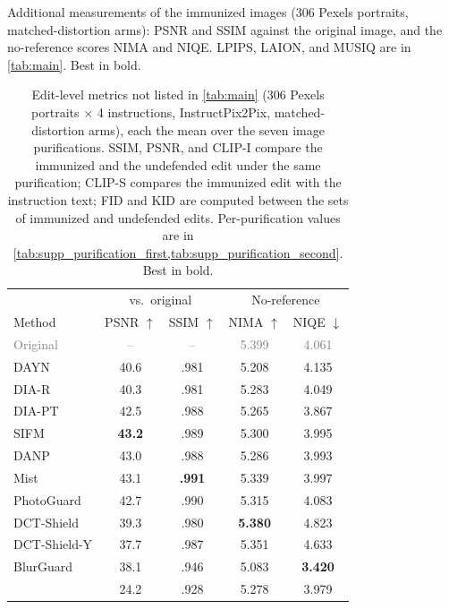 \begin{table}[t]
  \begin{minipage}[t]{0.44\textwidth}
  \centering
  \footnotesize
  \setlength{\tabcolsep}{4pt}
  \caption{Additional measurements of the immunized images (306 Pexels portraits, matched-distortion arms): PSNR and SSIM against the original image, and the no-reference scores NIMA and NIQE. LPIPS, LAION, and MUSIQ are in \cref{tab:main}. Best in bold.}
  \label{tab:supp_aesthetics}
  \begin{tabular}{l cc cc}
    \toprule
    & \multicolumn{2}{c}{vs.\ original} & \multicolumn{2}{c}{No-reference} \\
    \cmidrule(lr){2-3} \cmidrule(l){4-5}
    Method & PSNR $\uparrow$ & SSIM $\uparrow$ & NIMA $\uparrow$ & NIQE $\downarrow$ \\
    \midrule
    \textcolor{gray}{Original} & \textcolor{gray}{--} & \textcolor{gray}{--} & \textcolor{gray}{5.399} & \textcolor{gray}{4.061} \\
    \midrule
    DAYN & 40.6 & .981 & 5.208 & 4.135 \\
    DIA-R & 40.3 & .981 & 5.283 & 4.049 \\
    DIA-PT & 42.5 & .988 & 5.265 & 3.867 \\
    SIFM & \textbf{43.2} & .989 & 5.300 & 3.995 \\
    DANP & 43.0 & .988 & 5.286 & 3.993 \\
    Mist & 43.1 & \textbf{.991} & 5.339 & 3.997 \\
    PhotoGuard & 42.7 & .990 & 5.315 & 4.083 \\
    DCT-Shield & 39.3 & .980 & \textbf{5.380} & 4.823 \\
    DCT-Shield-Y & 37.7 & .987 & 5.351 & 4.633 \\
    BlurGuard & 38.1 & .946 & 5.083 & \textbf{3.420} \\
    \midrule
    \rowcolor{oursrow}
    \textbf{\capg{}} & 24.2 & .928 & 5.278 & 3.979 \\
    \bottomrule
  \end{tabular}
  \end{minipage}\hfill
  \begin{minipage}[t]{0.52\textwidth}
  \centering
  \footnotesize
  \setlength{\tabcolsep}{3pt}
  \caption{Edit-level metrics not listed in \cref{tab:main} (306 Pexels portraits $\times$ 4 instructions, InstructPix2Pix, matched-distortion arms), each the mean over the seven image purifications. SSIM, PSNR, and CLIP-I compare the immunized and the undefended edit under the same purification; CLIP-S compares the immunized edit with the instruction text; FID and KID are computed between the sets of immunized and undefended edits. Per-purification values are in \cref{tab:supp_purification_first,tab:supp_purification_second}. Best in bold.}

\end{minipage}
\end{table}
